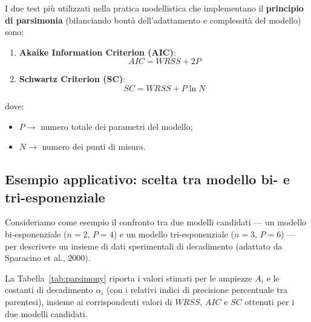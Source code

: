 I due test più utilizzati nella pratica modellistica che implementano il \textbf{principio di parsimonia} (bilanciando bontà dell'adattamento e complessità del modello) sono:
\begin{enumerate}
    \item \textbf{Akaike Information Criterion (AIC)}:
    \begin{equation}
    AIC = WRSS + 2P
    \end{equation}
    \item \textbf{Schwartz Criterion (SC)}:
    \begin{equation}
    SC = WRSS + P \ln N
    \end{equation}
\end{enumerate}
dove:
\begin{itemize}
    \item $P \rightarrow$ numero totale dei parametri del modello;
    \item $N \rightarrow$ numero dei punti di misura.
\end{itemize}

\subsection{Esempio applicativo: scelta tra modello bi- e tri-esponenziale}

Consideriamo come esempio il confronto tra due modelli candidati --- un modello bi-esponenziale ($n = 2$, $P = 4$) e un modello tri-esponenziale ($n = 3$, $P = 6$) --- per descrivere un insieme di dati sperimentali di decadimento (adattato da Sparacino et al., 2000).

La Tabella~\ref{tab:parsimony} riporta i valori stimati per le ampiezze $A_{i}$ e le costanti di decadimento $\alpha_{i}$ (con i relativi indici di precisione percentuale tra parentesi), insieme ai corrispondenti valori di $WRSS$, $AIC$ e $SC$ ottenuti per i due modelli candidati.

